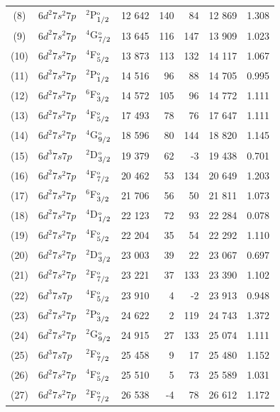 \documentclass[10pt,a4paper, twoside, openright]{report}
\begin{document}
{\begin{longtable}{cllrrrrr}
(8)  &   $6d^2 7s^2 7p$  &  $^2$P$^{\rm_o}_{1/2}$ &    12 642 & 140 &  84  & 12 869 & 1.308 \\ 
(9)  &  $6d^2 7s^2 7p$  &  $^4$G$^{\rm_o}_{7/2}$ &    13 645 &  116 &  147 & 13 909 & 1.023 \\ 
(10)   &  $6d^2 7s^2 7p$  &  $^4$F$^{\rm_o}_{5/2}$  &   13 873 & 113  &  132 & 14 117 & 1.067 \\ 
(11)   &  $6d^2 7s^2 7p$  &  $^2$P$^{\rm_o}_{1/2}$  &   14 516 & 96  &  88  & 14 705 & 0.995 \\ 
(12)   &  $6d^2 7s^2 7p$  &  $^6$F$^{\rm_o}_{3/2}$  &   14 572 & 105 & 96  & 14 772 & 1.111 \\ 
(13)   &  $6d^2 7s^2 7p$  &  $^4$F$^{\rm_o}_{5/2}$ &    17 493 & 78 &76  & 17 647 & 1.111 \\ 
(14)  &  $6d^2 7s^2 7p$  &  $^4$G$^{\rm_o}_{9/2}$   &  18 596 & 80 &  144  & 18 820  & 1.145 \\ 
(15)  & $6d^3 7s 7p$  &  $^2$D$^{\rm_o}_{3/2}$  &  19 379 & 62 &  -3  & 19 438 & 0.701 \\ 
 (16)  &  $6d^2 7s^2 7p$  &  $^4$F$^{\rm_o}_{7/2}$ &    20 462 & 53 & 134 & 20 649  & 1.203 \\ 
(17)  &  $6d^2 7s^2 7p$  &  $^6$F$^{\rm_o}_{3/2}$  &   21 706 & 56  & 50 & 21 811 & 1.073 \\ 
(18)  &  $6d^2 7s^2 7p$  &  $^4$D$^{\rm_o}_{1/2}$ &    22 123 & 72  & 93 & 22 284 & 0.078 \\ 
(19)   &  $6d^2 7s^2 7p$  &  $^4$F$^{\rm_o}_{5/2}$ &    22 204 & 35  & 54 & 22 292 & 1.110 \\ 
(20)  &  $6d^2 7s^2 7p$  &  $^2$D$^{\rm_o}_{3/2}$  &   23 003 & 39 & 22 & 23 067 & 0.697 \\ 
(21)  &  $6d^2 7s^2 7p$  &  $^2$F$^{\rm_o}_{7/2}$ &    23 221 & 37   & 133 & 23 390 & 1.102 \\ 
(22)  &  $6d^3 7s 7p$  &  $^4$F$^{\rm_o}_{5/2}$  &   23 910 &  4 &  -2 & 23 913 & 0.948 \\ 
(23) &   $6d^2 7s^2 7p$  &  $^2$P$^{\rm_o}_{3/2}$ &    24 622 & 2  &  119  & 24 743  & 1.372 \\ 
(24)  &   $6d^2 7s^2 7p$  &  $^2$G$^{\rm_o}_{9/2}$  &  24 915&  27  & 133 & 25 074 & 1.111 \\ 
 (25)  & $6d^3 7s 7p$  &  $^2$F$^{\rm_o}_{7/2}$ &    25 458 & 9  & 17  & 25 480 & 1.152 \\ 
(26) &   $6d^2 7s^2 7p$  &  $^4$F$^{\rm_o}_{5/2}$ &    25 510 & 5   & 73 & 25 589 & 1.031 \\ 
(27)   & $6d^2 7s^2 7p$  &  $^2$F$^{\rm_o}_{7/2}$ &    26 538 & -4   &  78 & 26 612 & 1.172 \\ 

\end{longtable}}
\end{document}
